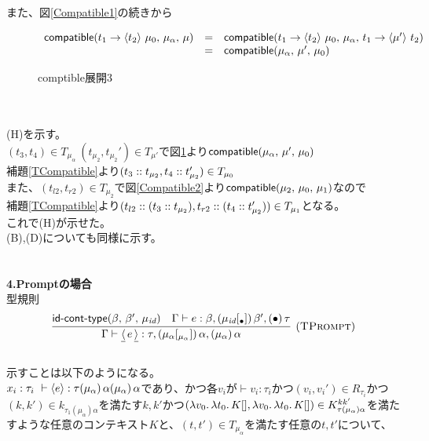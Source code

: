 また、図\ref{Compatible1}の続きから\\
\begin{figure}[h]
\[
\begin{array}{lcl}
  \Compatible{\Trail{t_1}{\mu_0}{t_2}}{\mu_{\alpha}}{\mu} &=& \Compatible{\Trail{t_1}{\mu_0}{t_2}}{\mu_{\alpha}}{\Trail{t_1}{t_2}{\mu'}}\\
  &=& \Compatible{\mu_{\alpha}}{\mu'}{\mu_0}
\end{array}
\]
\caption{\textsf{comptible}展開3}
\label{Compatible3}
\end{figure}\\
\\
(H)を示す。\\
$(t_3,t_4)\in T_{\mu_{\alpha}}\ (t_{\mu_2},t_{\mu_2}')\in T_{\mu'}$で図\ref{Compatible3}より$\Compatible{\mu_{\alpha}}{\mu'}{\mu_0}$\\
補題\ref{TCompatible}より$(\Cons{t_3}{t_{\mu_2}},\Cons{t_4}{t_{\mu_2}'})\in T_{\mu_0}$\\
また、$(t_{l2},t_{r2})\in T_{\mu_2}$で図\ref{Compatible2}より$\Compatible{\mu_2}{\mu_0}{\mu_1}$なので\\
補題\ref{TCompatible}より$(\Cons{t_{l2}}{\ConsP{t_3}{t_{\mu_2}}},\Cons{t_{r2}}{\ConsP{t_4}{t_{\mu_2}'}})\in T_{\mu_1}$となる。\\
これで(H)が示せた。\\
(B),(D)についても同様に示す。\\
\\
\\
\textbf{4.Promptの場合}\\
型規則
\[
\begin{array}{c}
  \infer[\TPrompt]
      {\JudgeTrail{\Gamma}{\DReset{e}}{\tau}{\TrailsType{\alpha}{\alpha}}
                                            {\TrailType{\alpha}}}
      {\IsIdTrail{\beta}{\beta'}{\MuId}
      &\JudgeTrail{\Gamma}{e}{\beta}
                  {\TsType{\MuId}{\beta'}{\Bullet}}
                  {\TType{\Bullet}{\tau}}}
\end{array}
\]
\\
示すことは以下のようになる。\\
$x_i:\tau_i\ \vdash \Prompt{e}:\tau \TrailType{\alpha} \TrailType{\alpha}$であり、かつ各$v_i$が$\vdash v_i:\tau_i$かつ$(v_i,v_i') \in R_{\tau_i}$かつ\\
$(k,k')\in k_{\tau_1(\mu_{\alpha})\alpha}$を満たす$k,k'$かつ$(\Lam{v_0}{\Lam{t_0}{K[]}}, \Lam{v_0}{\Lam{t_0}{K[]}})\in  K^{kk'}_{\tau(\mu_{\alpha})\alpha}$を満たすような任意のコンテキスト$K$と、$(t, t') \in T_{\mu_{\alpha}}$を満たす任意の$t, t'$について、\\
